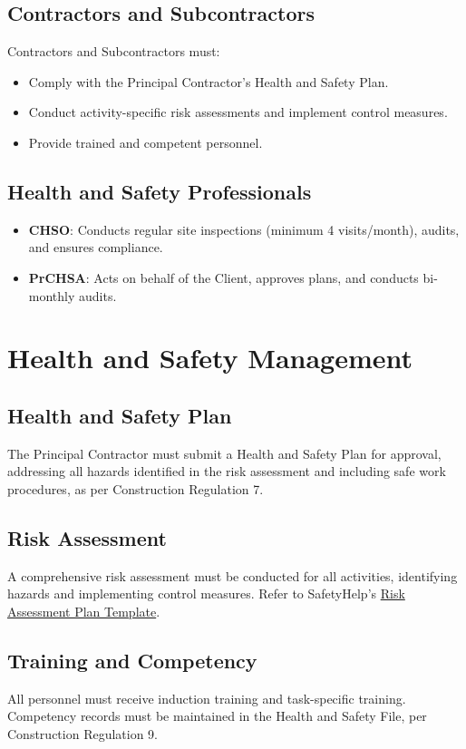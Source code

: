 \documentclass[11pt]{article}
\begin{document}
\subsection{Contractors and Subcontractors}
Contractors and Subcontractors must:
\begin{itemize}
  \item Comply with the Principal Contractor’s Health and Safety Plan.
  \item Conduct activity-specific risk assessments and implement control measures.
  \item Provide trained and competent personnel.
\end{itemize}

\subsection{Health and Safety Professionals}
\begin{itemize}
  \item \textbf{CHSO}: Conducts regular site inspections (minimum 4 visits/month), audits, and ensures compliance.
  \item \textbf{PrCHSA}: Acts on behalf of the Client, approves plans, and conducts bi-monthly audits.
\end{itemize}

\section{Health and Safety Management}
\subsection{Health and Safety Plan}
The Principal Contractor must submit a Health and Safety Plan for approval, addressing all hazards identified in the risk assessment and including safe work procedures, as per Construction Regulation 7.

\subsection{Risk Assessment}
A comprehensive risk assessment must be conducted for all activities, identifying hazards and implementing control measures. Refer to SafetyHelp’s \href{https://safetyfirst.help/templates/ohs-system/risk-assessment-plan-template.tex}{Risk Assessment Plan Template}.

\subsection{Training and Competency}
All personnel must receive induction training and task-specific training. Competency records must be maintained in the Health and Safety File, per Construction Regulation 9.
\end{document}
